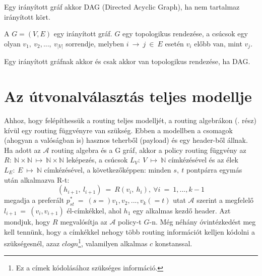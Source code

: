   \begin{definition} [DAG]
    Egy irányított gráf akkor DAG (Directed Acyclic Graph), ha nem tartalmaz irányított kört.
  \end{definition}

  \begin{definition} 
    A $G=(V,E)$ egy irányított gráf. $G$ egy topologikus rendezése, a csúcsok egy olyan $v_{1},~v_{2},...,~v_{|V|}$ sorrendje, melyben $i~\rightarrow~j~\in~E$ esetén $v_i$ előbb van, mint $v_j$.
  \end{definition}

  \begin{theorem}
    Egy irányított gráfnak akkor és csak akkor van topologikus rendezése, ha DAG.
  \end{theorem}
  \fi
  \newpage

  \section{Az útvonalválasztás teljes modellje }\label{sect:appendix_routingmodell}
  Ahhoz, hogy felépíthessük a routing teljes modelljét, a routing algebrákon (. rész) kívül egy routing függvényre van szükség. Ebben a modellben a csomagok (ahogyan a valóságban is) hasznos teherből (payload) és egy header-ből állnak. Ha adott az $\mathcal{A}$ routing algebra és a G gráf, akkor a policy routing függvény az $R:~ \mathbb{N} \times \mathbb{N}~\mapsto~\mathbb{N} \times \mathbb{N}$ leképezés, a csúcsok $L_{V}:~V~\mapsto~\mathbb{N}$ címkézésével és az élek $L_{E}:~E~\mapsto~\mathbb{N}$ címkézésével, a következőképpen: minden $s,~t$ pontpárra egymás után alkalmazva R-t:
  $$(h_{i+1},~l_{i+1})~=~R(v_{i},~h_{i}),~\forall i~=~1, ..., k-1$$
  megadja a preferált $p_{st}^{*}~=~(s=) v_{1}, v_{2}, ..., v_{k}(=t)$ utat $\mathcal{A}$ szerint a megfelelő $l_{i+1}~=~(v_{i},v_{i+1})$ él-címkékkel, ahol $h_{1}$ egy alkalmas kezdő header. Azt mondjuk, hogy $R$ megvalósítja az $\mathcal{A}$ policy-t $G$-n. Még néhány óvintézkedést meg kell tennünk, hogy a címkékkel nehogy több routing információt kelljen kódolni a szükségesnél, azaz $c log n$\footnote{ Ez a címek kódolásához szükséges információ.}, valamilyen alkalmas $c$ konstanssal.

